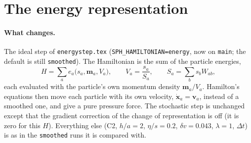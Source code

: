 \documentclass[11pt,aps,preprint,nofootinbib,superscriptaddress,tightenlines]{revtex4-2}
\def\st{\begin{equation}}
\def\stp{\end{equation}}
\let\oldparagraph\paragraph
\renewcommand{\paragraph}{\par\bigskip\oldparagraph}
\begin{document}
\section{The energy representation}
\label{sec:energy}

\paragraph{What changes.}  The ideal step of \texttt{energystep.tex}
(\texttt{SPH\_HAMILTONIAN=energy}, now on \texttt{main}; the default is still
\texttt{smoothed}).  The Hamiltonian is the sum of the particle energies,
\st
H=\sum_ae_a\big(s_a,\bm m_a,V_a\big),\qquad V_a=\frac{s_a}{S_a},\qquad S_a=\sum_bs_bW_{ab},
\stp
each evaluated with the particle's own momentum density $\bm m_a/V_a$.  Hamilton's equations
then move each particle with its own velocity, $\dot{\bm x}_a=\bm v_a$, instead of a
smoothed one, and give a pure pressure force.  The stochastic step is unchanged except that
the gradient correction of the change of representation is off (it is zero for this $H$).
Everything else (C2, $h/a=2$, $\eta/s=0.2$, $\delta v=0.043$, $\lambda=1$, $\Delta t$) is as
in the \texttt{smoothed} runs it is compared with.
\end{document}
